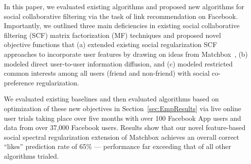 

In this paper, we evaluated existing algorithms and proposed new
algorithms for social collaborative filtering via the task of link
recommendation on Facebook.  Importantly, we outlined three main
deficiencies in existing social collaborative filtering (SCF) matrix
factorization (MF) techniques and proposed novel objective functions
that (a) extended existing social regularization SCF 
approaches to incorporate user features by drawing on ideas
from Matchbox~\cite{matchbox}, (b) modeled direct user-to-user information
diffusion, and (c) modeled restricted common interests among all
users (friend and non-friend) with social co-preference regularization.

We evaluated existing baselines and then evaluated algorithms based
on optimization of these new objectives
in Section~\ref{sec:EmpResults} via live online user trials
taking place over five months with over 100 Facebook App users and data from over
37,000 Facebook users.  Results show that our novel feature-based
social spectral regularization extension of Matchbox achieves an
overall correct ``likes'' prediction rate of 65\% --- performance
far exceeding that of all other algorithms trialed.


